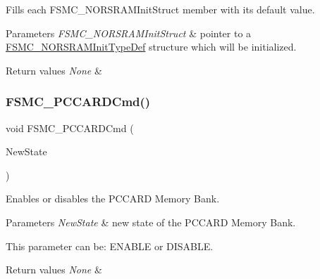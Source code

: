 Fills each F\+S\+M\+C\+\_\+\+N\+O\+R\+S\+R\+A\+M\+Init\+Struct member with its default value. 


\begin{DoxyParams}{Parameters}
{\em F\+S\+M\+C\+\_\+\+N\+O\+R\+S\+R\+A\+M\+Init\+Struct} & pointer to a \mbox{\hyperlink{struct_f_s_m_c___n_o_r_s_r_a_m_init_type_def}{F\+S\+M\+C\+\_\+\+N\+O\+R\+S\+R\+A\+M\+Init\+Type\+Def}} structure which will be initialized. \\
\hline
\end{DoxyParams}

\begin{DoxyRetVals}{Return values}
{\em None} & \\
\hline
\end{DoxyRetVals}
\mbox{\label{group___f_s_m_c___private___functions_ga2d410151ceb3428c6a1bf374a0472cde}} 
\subsubsection{\texorpdfstring{FSMC\_PCCARDCmd()}{FSMC\_PCCARDCmd()}}
{\footnotesize\ttfamily void F\+S\+M\+C\+\_\+\+P\+C\+C\+A\+R\+D\+Cmd (\begin{DoxyParamCaption}\item[{\mbox{\hyperlink{group___exported__types_gac9a7e9a35d2513ec15c3b537aaa4fba1}{Functional\+State}}}]{New\+State }\end{DoxyParamCaption})}



Enables or disables the P\+C\+C\+A\+RD Memory Bank. 


\begin{DoxyParams}{Parameters}
{\em New\+State} & new state of the P\+C\+C\+A\+RD Memory Bank.\\
\hline
\end{DoxyParams}
This parameter can be\+: E\+N\+A\+B\+LE or D\+I\+S\+A\+B\+LE. 
\begin{DoxyRetVals}{Return values}
{\em None} & \\
\hline
\end{DoxyRetVals}
\mbox{\label{group___f_s_m_c___private___functions_ga2f53ccf3a4f3c80a5a56fb47ccd47ccd}} 
